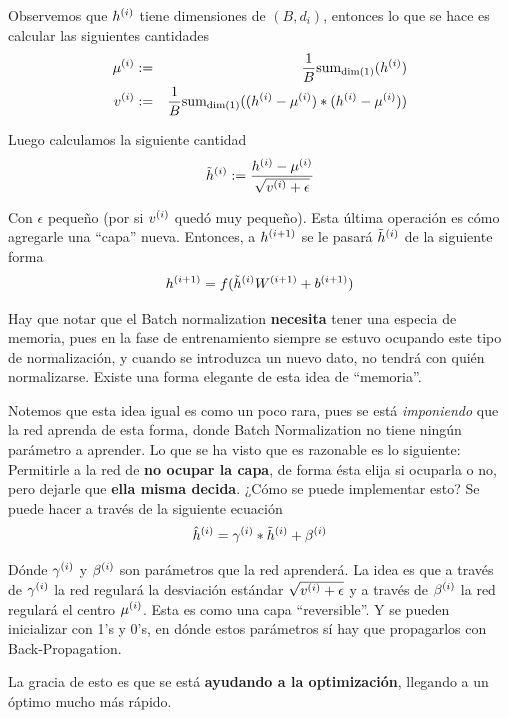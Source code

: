 Observemos que $h\entr$ tiene dimensiones de $(B, d_i)$, entonces lo que se hace es calcular las siguientes cantidades
\begin{eqnarray}
\mu\entr &:=& \frac{1}{B} \mbox{sum}_{\dim(1)} (h\entr)\\
v\entr &:=& \frac{1}{B} \mbox{sum}_{\dim(1)} ((h\entr - \mu\entr) \ast (h\entr - \mu\entr))
\end{eqnarray}

Luego calculamos la siguiente cantidad
\begin{eqnarray}
\Tilde{h}\entr := \frac{h\entr - \mu\entr}{\sqrt{v\entr + \epsilon}}
\end{eqnarray}

Con $\epsilon$ pequeño (por si $v\entr$ quedó muy pequeño). Esta última operación es cómo agregarle una ``capa'' nueva. Entonces, a $h\entr[i+1]$ se le pasará $\Tilde{h}\entr$ de la siguiente forma
\begin{eqnarray}
h\entr[i+1] = f(\Tilde{h}\entr W\entr[i+1] + b\entr[i+1])
\end{eqnarray}

Hay que notar que el Batch normalization \textbf{necesita} tener una especia de memoria, pues en la fase de entrenamiento siempre se estuvo ocupando este tipo de normalización, y cuando se introduzca un nuevo dato, no tendrá con quién normalizarse. Existe una forma elegante de esta idea de ``memoria''.

Notemos que esta idea igual es como un poco rara, pues se está \textit{imponiendo} que la red aprenda de esta forma, donde Batch Normalization no tiene ningún parámetro a aprender. Lo que se ha visto que es razonable es lo siguiente: Permitirle a la red de \textbf{no ocupar la capa}, de forma ésta elija si ocuparla o no, pero dejarle que \textbf{ella misma decida}. ¿Cómo se puede implementar esto? Se puede hacer a través de la siguiente ecuación
\begin{eqnarray}
\hat{h}\entr = \gamma\entr \ast \Tilde{h}\entr + \beta\entr
\end{eqnarray}

Dónde $\gamma\entr$ y $\beta\entr$ son parámetros que la red aprenderá. La idea es que a través de $\gamma\entr$ la red regulará la desviación estándar $\sqrt{v\entr + \epsilon}$ y a través de $\beta\entr$ la red regulará el centro $\mu\entr$. Esta es como una capa ``reversible''. Y se pueden inicializar con 1's y 0's, en dónde estos parámetros sí hay que propagarlos con Back-Propagation.

La gracia de esto es que se está \textbf{ayudando a la optimización}, llegando a un óptimo mucho más rápido.

